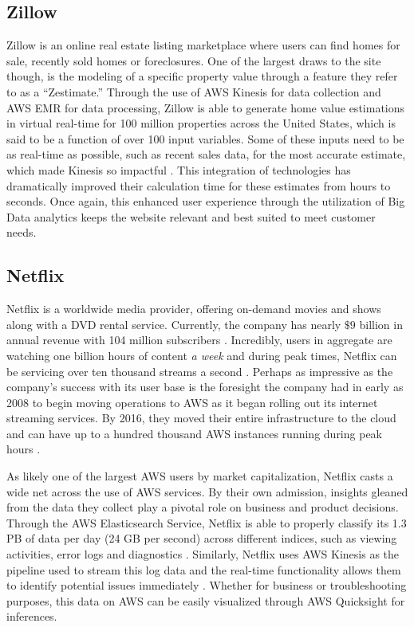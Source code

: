 \documentclass[sigconf]{acmart}
\begin{document}
\subsection{Zillow}
Zillow is an online real estate listing marketplace where users can find homes for sale, recently sold homes or foreclosures. One of the largest draws to the site though, is the modeling of a specific property value through a feature they refer to as a ``Zestimate.'' Through the use of AWS Kinesis for data collection and AWS EMR for data processing, Zillow is able to generate home value estimations in virtual real-time for 100 million properties across the United States, which is said to be a function of over 100 input variables\cite{zillowaws}. Some of these inputs need to be as real-time as possible, such as recent sales data, for the most accurate estimate, which made Kinesis so impactful  \cite{zillowdata}. This integration of technologies has dramatically improved their calculation time for these estimates from hours to seconds\cite{zillowaws}. Once again, this enhanced user experience through the utilization of Big Data analytics keeps the website relevant and best suited to meet customer needs. 
\subsection{Netflix}
Netflix is a worldwide media provider, offering on-demand movies and shows along with a DVD rental service. Currently, the company has nearly $\$9$ billion in annual revenue with 104 million subscribers \cite{nflx}. Incredibly, users in aggregate are watching one billion hours of content \emph{a week}  and during peak times, Netflix can be servicing over ten thousand streams a second \cite{nflxbn}. Perhaps as impressive as the company's success with its user base is the foresight the company had in early as 2008 to begin moving operations to AWS as it began rolling out its internet streaming services. By 2016, they moved their entire infrastructure to the cloud and can have up to a hundred thousand AWS instances running during peak hours \cite{nflxconf}. 

As likely one of the largest AWS users by market capitalization, Netflix casts a wide net across the use of AWS services. By their own admission, insights gleaned from the data they collect play a pivotal role on business and product decisions. Through the AWS Elasticsearch Service, Netflix is able to properly classify its 1.3 PB of data per day (24 GB per second) across different indices, such as viewing activities, error logs and diagnostics \cite{nflxtech}. Similarly, Netflix uses AWS Kinesis as the pipeline used to stream this log data and the real-time functionality allows them to identify potential issues immediately \cite{nflxkin}. Whether for business or troubleshooting purposes, this data on AWS can be easily visualized through AWS Quicksight for inferences. 
\end{document}
